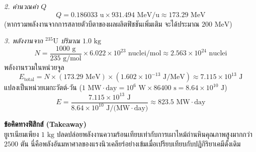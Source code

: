 \begin{psctexample}
\textit{2. คำนวณค่า $Q$}
\begin{equation}
Q = 0.186033\text{ u} \times 931.494\text{ MeV/u} \approx 173.29\text{ MeV}
\end{equation}
(หากรวมพลังงานจากการสลายตัวบีตาของผลผลิตฟิชชันเพิ่มเติม จะได้ประมาณ $200\text{ MeV}$)

\textit{3. พลังงานจาก $^{235}\text{U}$ ปริมาณ $1.0\text{ kg}$}
\begin{equation}
N = \frac{1000\text{ g}}{235\text{ g/mol}} \times 6.022 \times 10^{23}\text{ nuclei/mol} \approx 2.563 \times 10^{24}\text{ nuclei}
\end{equation}
พลังงานรวมในหน่วยจูล
\begin{equation}
E_{\text{total}} = N \times (173.29\text{ MeV}) \times (1.602 \times 10^{-13}\text{ J/MeV}) \approx 7.115 \times 10^{13}\text{ J}
\end{equation}
แปลงเป็นหน่วยเมกะวัตต์-วัน ($1\text{ MW}\cdot\text{day} = 10^6\text{ W} \times 86400\text{ s} = 8.64 \times 10^{10}\text{ J}$)
\begin{equation}
E = \frac{7.115 \times 10^{13}\text{ J}}{8.64 \times 10^{10}\text{ J/(MW}\cdot\text{day)}} \approx 823.5\text{ MW}\cdot\text{day}
\end{equation}

\textbf{ข้อคิดทางฟิสิกส์ (Takeaway)} \\
ยูเรเนียมเพียง $1\text{ kg}$ ปลดปล่อยพลังงานความร้อนเทียบเท่ากับการเผาไหม้ถ่านหินคุณภาพสูงมากกว่า $2500\text{ ตัน}$ นี่คือพลังอันมหาศาลของแรงนิวเคลียร์อย่างเข้มเมื่อเปรียบเทียบกับปฏิกิริยาเคมีดั้งเดิม
\qedexam
\end{psctexample}

